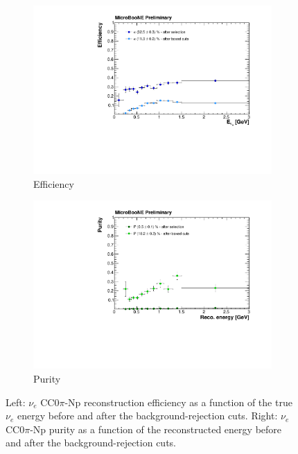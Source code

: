 \begin{figure}
  \begin{subfigure}{0.48\textwidth}
    \includegraphics[width=\linewidth]{figures/eff_after.pdf}
    \caption{Efficiency} 
  \end{subfigure}
    \begin{subfigure}{0.48\textwidth}
    \includegraphics[width=\linewidth]{figures/purity_after.pdf}
    \caption{Purity} 
  \end{subfigure}
  \caption{Left: $\nu_{e}$ CC$0\pi$-Np reconstruction efficiency as a function of the true $\nu_{e}$ energy before and after the background-rejection cuts. Right: $\nu_{e}$ CC$0\pi$-Np purity as a function of the reconstructed energy before and after the background-rejection cuts.}
  \label{fig:effafter}
\end{figure}